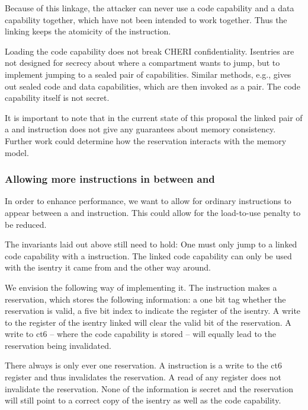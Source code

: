 Because of this linkage, the attacker can never use a code capability and a data capability together, which have not been intended to work together.
Thus the linking keeps the atomicity of the instruction.

Loading the code capability does not break CHERI confidentiality.
Isentries are not designed for secrecy about where a compartment wants to jump, but to implement jumping to a sealed pair of capabilities.
Similar methods, e.g.,  gives out sealed code and data capabilities, which are then invoked as a pair.
The code capability itself is not secret.

It is important to note that in the current state of this proposal the linked pair of a  and  instruction does not give any guarantees about memory consistency.
Further work could determine how the reservation interacts with the memory model.

\subsubsection{Allowing more instructions in between  and }

In order to enhance performance, we want to allow for ordinary instructions to appear between a  and  instruction.
This could allow for the load-to-use penalty to be reduced.

The invariants laid out above still need to hold: One must only jump to a linked code capability with a  instruction.
The linked code capability can only be used with the isentry it came from and the other way around.

We envision the following way of implementing it.
The  instruction makes a reservation, which stores the following information: a one bit tag whether the reservation is valid, a five bit index to indicate the register of the isentry.
A write to the register of the isentry linked will clear the valid bit of the reservation.
A write to ct6 -- where the code capability is stored -- will equally lead to the reservation being invalidated.

There always is only ever one reservation.
A  instruction is a write to the ct6 register and thus invalidates the reservation.
A read of any register does not invalidate the reservation.
None of the information is secret and the reservation will still point to a correct copy of the isentry as well as the code capability.

